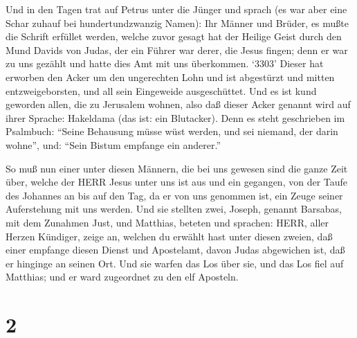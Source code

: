  Und in den Tagen trat auf Petrus unter die Jünger und
sprach (es war aber eine Schar zuhauf bei hundertundzwanzig Namen):
 Ihr Männer und Brüder, es mußte die Schrift erfüllet
werden, welche zuvor gesagt hat der Heilige Geist durch den Mund Davids
von Judas, der ein Führer war derer, die Jesus fingen; 
denn er war zu uns gezählt und hatte dies Amt mit uns überkommen.
 `3303' Dieser hat erworben den Acker um den ungerechten
Lohn und ist abgestürzt und mitten entzweigeborsten, und all sein
Eingeweide ausgeschüttet.  Und es ist kund geworden allen,
die zu Jerusalem wohnen, also daß dieser Acker genannt wird auf ihrer
Sprache: Hakeldama (das ist: ein Blutacker).  Denn es steht
geschrieben im Psalmbuch: ``Seine Behausung müsse wüst werden, und sei
niemand, der darin wohne'', und: ``Sein Bistum empfange ein anderer.''

 So muß nun einer unter diesen Männern, die bei uns gewesen
sind die ganze Zeit über, welche der HERR Jesus unter uns ist aus und
ein gegangen,  von der Taufe des Johannes an bis auf den
Tag, da er von uns genommen ist, ein Zeuge seiner Auferstehung mit uns
werden.  Und sie stellten zwei, Joseph, genannt Barsabas,
mit dem Zunahmen Just, und Matthias,  beteten und sprachen:
HERR, aller Herzen Kündiger, zeige an, welchen du erwählt hast unter
diesen zweien,  daß einer empfange diesen Dienst und
Apostelamt, davon Judas abgewichen ist, daß er hinginge an seinen Ort.
 Und sie warfen das Los über sie, und das Los fiel auf
Matthias; und er ward zugeordnet zu den elf Aposteln.

\hypertarget{section-1}{%
\section{2}\label{section-1}}

